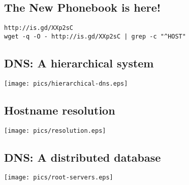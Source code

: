 \documentclass[xga]{xdvislides}
\begin{document}
\subsection{The New Phonebook is here!}
\vspace*{\fill}
\begin{center}
	\verb+http://is.gd/XXp2sC+ \\
	\addvspace{.5in}
	\verb+wget -q -O - http://is.gd/XXp2sC | grep -c "^HOST"+
\end{center}
\vspace*{\fill}

\subsection{DNS: A hierarchical system}
\vspace*{\fill}
\begin{center}
	\texttt{[image: pics/hierarchical-dns.eps]}
\end{center}
\vspace*{\fill}

\subsection{Hostname resolution}
\vspace*{\fill}
\begin{center}
	\texttt{[image: pics/resolution.eps]}
\end{center}
\vspace*{\fill}

\subsection{DNS: A distributed database}
\vspace*{\fill}
\begin{center}
	\texttt{[image: pics/root-servers.eps]}
\end{center}
\vspace*{\fill}
\end{document}
